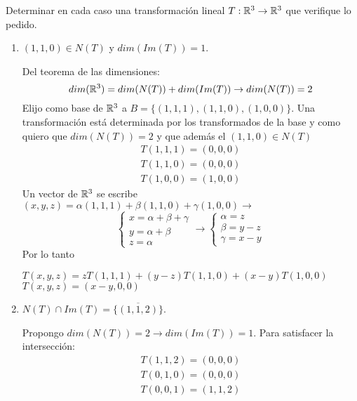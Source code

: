 \item Determinar en cada caso una transformación lineal $T:\mathbb{R}^3\to\mathbb{R}^3$ que verifique lo pedido.
    \begin{enumerate}
        \item $(1,1,0)\in N(T)$ y $dim(Im(T))=1$.
            \begin{mdframed}[style=s]
                Del teorema de las dimensiones:\[dim(\mathbb{R}^3)=dim(N(T))+dim(Im(T))\to dim(N(T))=2\]
                Elijo como base de $\mathbb{R}^3$ a $B=\{(1,1,1),(1,1,0),(1,0,0)\}$. Una transformación está determinada por los transformados de la base y como quiero que $dim(N(T))=2$ y que además el $(1,1,0)\in N(T)$\[\begin{matrix}
                    T(1,1,1)=(0,0,0)\\
                    T(1,1,0)=(0,0,0)\\
                    T(1,0,0)=(1,0,0)
                \end{matrix}\]
                Un vector de $\mathbb{R}^3$ se escribe $(x,y,z)=\alpha(1,1,1)+\beta(1,1,0)+\gamma(1,0,0)\to$\[\begin{cases}
                    x=\alpha+\beta+\gamma\\
                    y=\alpha+\beta\\
                    z=\alpha
                \end{cases}\to\begin{cases}
                    \alpha=z\\
                    \beta=y-z\\
                    \gamma=x-y
                \end{cases}\]
                Por lo tanto
                \begin{center}
                    $T(x,y,z)=zT(1,1,1)+(y-z)T(1,1,0)+(x-y)T(1,0,0)$\\
                    $T(x,y,z)=(x-y,0,0)$
                \end{center}
            \end{mdframed}
        \item $N(T)\cap Im(T)=\overline{\{(1,1,2)\}}$.
            \begin{mdframed}[style=s]
                Propongo $dim(N(T))=2\to dim(Im(T))=1$. Para satisfacer la intersección:\[\begin{matrix}
                    T(1,1,2)=(0,0,0)\\
                    T(0,1,0)=(0,0,0)\\
                    T(0,0,1)=(1,1,2)

\end{matrix}\]
\end{mdframed}
\end{enumerate}

